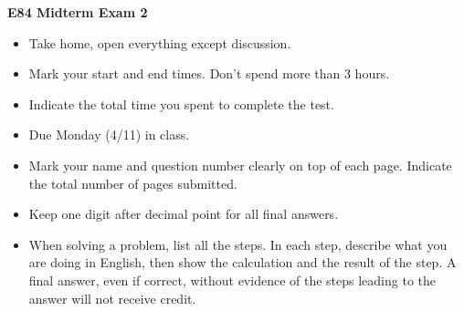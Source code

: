 \usepackage{html}

\begin{center}
{\Large \bf E84 Midterm Exam 2}
\end{center}

\begin{itemize}
\item Take home, open everything except discussion.
\item Mark your start and end times. Don't spend more than 3 hours.
\item Indicate the total time you spent to complete the test.
\item Due Monday (4/11) in class.
\item Mark your name and question number clearly on top of each page.
	Indicate the total number of pages submitted.
\item Keep one digit after decimal point for all final answers. 
\item When solving a problem, list all the steps. In each step, describe 
	what you are doing in English, then show the calculation and the 
	result of the step. A final answer, even if correct, without 
	evidence of the steps leading to the answer will not receive credit.
\end{itemize}

